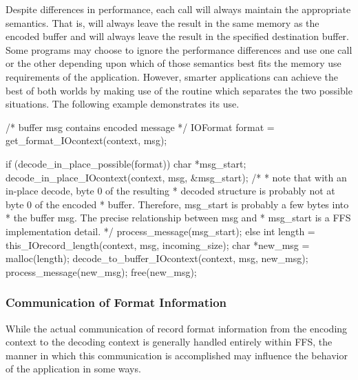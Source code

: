 Despite differences in performance, each call will always maintain the
appropriate semantics.
That is,  will always leave the result in
the same memory as the encoded buffer and  will
always leave the result in the specified destination buffer.  Some programs
may choose to ignore the performance differences and use one call or the other
depending upon which of those semantics best fits the memory use requirements
of the application.  However, smarter applications can achieve the best of
both worlds by making use of the  routine
which separates the two possible situations.  The following example
demonstrates its use.
\begin{Code}
    /* buffer msg contains encoded message */
    IOFormat format = get_format_IOcontext(context, msg);

    if (decode_in_place_possible(format)) {
        char *msg_start;
        decode_in_place_IOcontext(context, msg, &msg_start);
        /*
         * note that with an in-place decode, byte 0 of the resulting
         * decoded structure is probably not at byte 0 of the encoded
         * buffer.  Therefore, msg_start is probably a few bytes into
         * the buffer msg.  The precise relationship between msg and
         * msg_start is a FFS implementation detail.
         */
        process_message(msg_start);
    } else {
        int length = this_IOrecord_length(context, msg, incoming_size);
        char *new_msg = malloc(length);
        decode_to_buffer_IOcontext(context, msg, new_msg);
        process_message(new_msg);
        free(new_msg);
    }

\end{Code}
\subsubsection{Communication of Format Information }
While the actual communication of record format information from the
encoding context to the decoding context is generally handled entirely
within FFS, the manner in which this communication is accomplished may
influence the behavior of the application in some ways.

